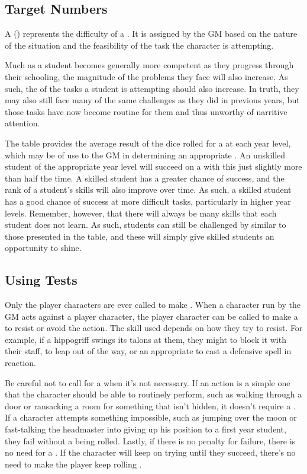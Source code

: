 \subsection{Target Numbers}

A {\targetnumber} ({\tn}) represents the difficulty of a {\test}.
It is assigned by the GM based on the nature of the situation and the feasibility of the task the character is attempting.

Much as a student becomes generally more competent as they progress through their schooling, the magnitude of the problems they face will also increase.
As such, the {\tns} of the tasks a student is attempting should also increase.
In truth, they may also still face many of the same challenges as they did in previous years, but those tasks have now become routine for them and thus unworthy of narritive attention.

The  table provides the average result of the dice rolled for a {\test} at each year level, which may be of use to the GM in determining an appropriate {\tn}.
An unskilled student of the appropriate year level will succeed on a {\test} with this {\tn} just slightly more than half the time.
A skilled student has a greater chance of success, and the rank of a student's skills will also improve over time.
As such, a skilled student has a good chance of success at more difficult tasks, particularly in higher year levels.
Remember, however, that there will always be many skills that each student does not learn.
As such, students can still be challenged by {\tns} similar to those presented in the table, and these will simply give skilled students an opportunity to shine.

\subsection{Using Tests}

Only the player characters are ever called to make {\tests}.
When a character run by the GM acts against a player character, the player character can be called to make a {\test} to resist or avoid the action.
The skill used depends on how they try to resist.
For example, if a hippogriff swings its talons at them, they might {\test}  to block it with their staff, {\test}  to leap out of the way, or {\test} an appropriate {\magicskill} to cast a defensive spell in reaction.

Be careful not to call for a {\test} when it's not necessary.
If an action is a simple one that the character should be able to routinely perform, such as walking through a door or ransacking a room for something that isn't hidden, it doesn't require a {\test}.
If a character attempts something impossible, such as jumping over the moon or fast-talking the headmaster into giving up his position to a first year student, they fail without a {\test} being rolled.
Lastly, if there is no penalty for failure, there is no need for a {\test}.
If the character will keep on trying until they succeed, there's no need to make the player keep rolling {\tests}.

